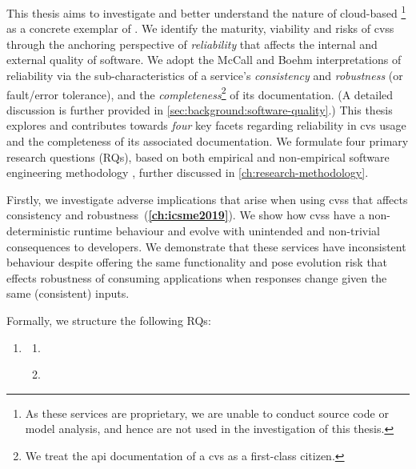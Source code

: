 This thesis aims to investigate and better understand the nature of cloud-based \footnote{As these services are proprietary, we are unable to conduct source code or model analysis, and hence are not used in the investigation of this thesis.} as a concrete exemplar of .
We identify the maturity, viability and risks of \glspl{cvs} through the anchoring perspective of \textit{reliability} that affects the internal and external quality of software. We adopt the McCall \citep{McCall:1977uy} and Boehm \citep{Boehm:1978vv} interpretations of reliability via the sub-characteristics of a service's \textit{consistency} and \textit{robustness} (or fault/error tolerance), and the \textit{completeness}\footnote{We treat the \gls{api} documentation of a \gls{cvs} as a first-class citizen.} of its documentation. (A detailed discussion is further provided in \cref{sec:background:software-quality}.)
This thesis explores and contributes towards \textit{four} key facets regarding reliability in \gls{cvs} usage and the completeness of its associated documentation. We formulate four primary research questions (RQs), based on both empirical and non-empirical software engineering methodology \citep{Simon:1996uw}, further discussed in \cref{ch:research-methodology}.

Firstly, we investigate adverse implications that arise when using \glspl{cvs} that affects consistency and robustness~(\textbf{\cref{ch:icsme2019}}). We show how \glspl{cvs} have a non-deterministic runtime behaviour and evolve with unintended and non-trivial consequences to developers. We demonstrate that these services have inconsistent behaviour despite offering the same functionality and pose evolution risk that effects robustness of consuming applications when responses change given the same (consistent) inputs. 

Formally, we structure the following RQs:

\begin{leftbar}
\begin{enumerate}[label=\faQuestionCircle~~\textbf{RQ\arabic*.}, ref=RQ\arabic*, leftmargin=2.5\parindent, rightmargin=1\parindent]
    \item \textbf{\RQOneTextLandscapeAnalysis{}}\label{rq:nature}
    \begin{enumerate}[label=\textit{RQ1.\arabic*.}, ref=RQ1.\arabic*]
      \item \RQOneTextLandscapeAnalysisRuntime{}\label{rq:nature:runtime}
      \item \RQOneTextLandscapeAnalysisEvolution{}\label{rq:nature:evolution}
    \end{enumerate}
\end{enumerate}
\end{leftbar}

